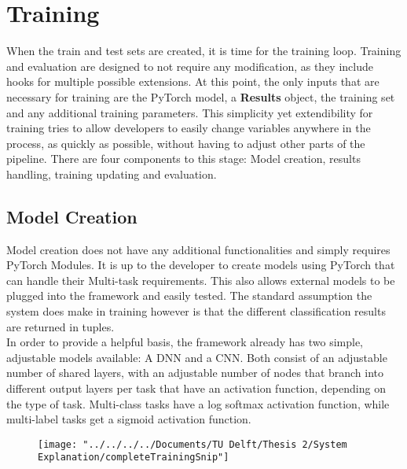 \section{Training} \label{Impl:Training}

When the train and test sets are created, it is time for the training loop. Training and evaluation are designed to not require any modification, as they include hooks for multiple possible extensions. At this point, the only inputs that are necessary for training are the PyTorch model, a \textbf{Results} object, the training set and any additional training parameters. This simplicity yet extendibility for training tries to allow developers to easily change variables anywhere in the process, as quickly as possible, without having to adjust other parts of the pipeline. There are four components to this stage: Model creation, results handling, training updating and evaluation. \\

\subsection{Model Creation} \label{Impl:Training:Model}

Model creation does not have any additional functionalities and simply requires PyTorch Modules. It is up to the developer to create models using PyTorch that can handle their Multi-task requirements. This also allows external models to be plugged into the framework and easily tested. The standard assumption the system does make in training however is that the different classification results are returned in tuples. \\

In order to provide a helpful basis, the framework already has two simple, adjustable models available: A DNN and a CNN. Both consist of an adjustable number of shared layers, with an adjustable number of nodes that branch into different output layers per task that have an activation function, depending on the type of task. Multi-class tasks have a log softmax activation function, while multi-label tasks get a sigmoid activation function. \\ 

\begin{figure}
	\centering
	\texttt{[image: "../../../../Documents/TU Delft/Thesis 2/System Explanation/completeTrainingSnip"]}
	\caption{}
	\label{fig:completetrainingsnip}
\end{figure}

